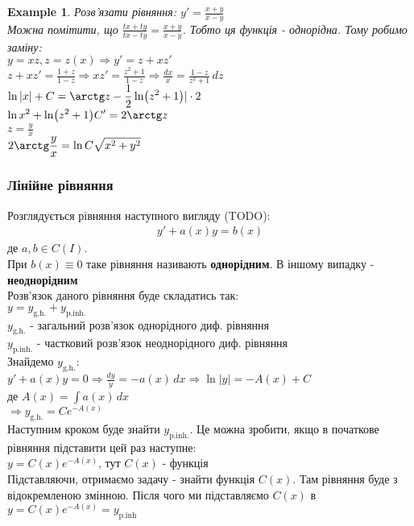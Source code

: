 \documentclass[a4paper, 10pt]{article}
\theoremstyle{theoremdd}
\theoremstyle{theoremdd}
\theoremstyle{theoremdd}
\theoremstyle{theoremdd}
\newtheorem{example}[theorem]{Example}
\theoremstyle{theoremdd}
\theoremstyle{theoremdd}
\theoremstyle{theoremdd}
\theoremstyle{theoremdd}
\begin{document}
	\begin{example}
 Розв'язати рівняння: $\displaystyle y' = \frac{x+y}{x-y}$\\
	Можна помітити, що $\displaystyle \frac{tx+ty}{tx-ty} = \frac{x+y}{x-y}$. Тобто ця функція - однорідна. Тому робимо заміну:\\
	$y = xz, z=z(x) \Rightarrow y' = z + xz'$\\
	$\displaystyle z+xz'=\frac{1+z}{1-z} \Rightarrow xz'=\frac{z^2+1}{1-z} \Rightarrow \frac{dx}{x} = \frac{1-z}{z^2+1} \,dz$\\
	$\displaystyle \ln |x| + C = \arctg z - \frac{1}{2} \ln (z^2+1) |\cdot 2$\\
	$\displaystyle \ln x^2 + \ln (z^2+1) C' = 2 \arctg z$\\
	$\displaystyle z = \frac{y}{x}$\\
	$\displaystyle 2 \arctg \frac{y}{x} = \ln C\sqrt{x^2+y^2}$
	\end{example}

	
	\subsubsection{Лінійне рівняння}
	Розглядується рівняння наступного вигляду (TODO):
	\begin{align*}
	y' + a(x)y = b(x)
	\end{align*}
	де $a,b \in C(I)$.\\
	При $b(x) \equiv 0$ таке рівняння називають \textbf{однорідним}. В іншому випадку - \textbf{неоднорідним}\\
	Розв'язок даного рівняння буде складатись так:\\ $y = y_{\textrm{g.h.}} + y_{\textrm{p.inh.}}$\\
	$y_{\textrm{g.h.}}$ - загальний розв'язок однорідного диф. рівняння\\
	$y_{\textrm{p.inh.}}$ - частковий розв'язок неоднорідного диф. рівняння\\
	Знайдемо $y_{\textrm{g.h.}}$:\\
	$y'+a(x)y=0 \Rightarrow \displaystyle \frac{dy}{y} = -a(x)\,dx \Rightarrow \ln |y| = -A(x) + C$\\ де $\displaystyle A(x) = \int a(x)\,dx$\\
	$\displaystyle \Rightarrow y_{\textrm{g.h.}} = Ce^{-A(x)}$\\
	Наступним кроком буде знайти $y_{\textrm{p.inh.}}$. Це можна зробити, якщо в початкове рівняння підставити цей раз наступне:\\
	$\displaystyle y = C(x)e^{-A(x)}$, тут $C(x)$ - функція\\
	Підставляючи, отримаємо задачу - знайти функція $C(x)$. Там рівняння буде з відокремленою змінною. Після чого ми підставляємо $C(x)$ в\\ $y = C(x)e^{-A(x)} = y_{\textrm{p.inh}}$
	
\end{document}
